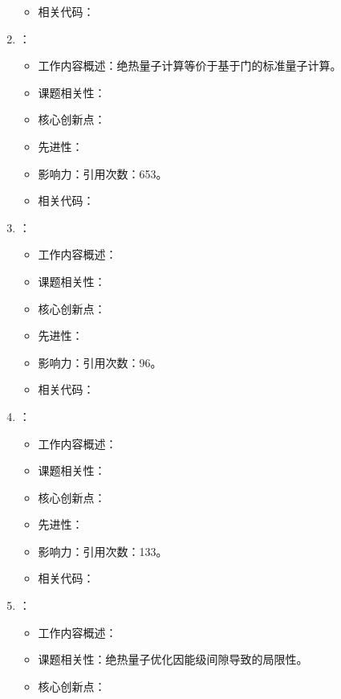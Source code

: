 \begin{enumerate}
\begin{itemize}
                \item 相关代码：
            \end{itemize}
            \item \citet{aharonov2008adiabatic}：
            \begin{itemize}
                \item 工作内容概述：绝热量子计算等价于基于门的标准量子计算。
                \item 课题相关性：
                \item 核心创新点：
                \item 先进性：
                \item 影响力：引用次数：653。
                \item 相关代码：
            \end{itemize}
            \item \citet{amin2009first}：
            \begin{itemize}
                \item 工作内容概述：
                \item 课题相关性：
                \item 核心创新点：
                \item 先进性：
                \item 影响力：引用次数：96。
                \item 相关代码：
            \end{itemize}
            \item \citet{bravyi2010complexity}：
            \begin{itemize}
                \item 工作内容概述：
                \item 课题相关性：
                \item 核心创新点：
                \item 先进性：
                \item 影响力：引用次数：133。
                \item 相关代码：
            \end{itemize}
            \item \citet{altshuler2010anderson}：
            \begin{itemize}
                \item 工作内容概述：
                \item 课题相关性：绝热量子优化因能级间隙导致的局限性。
                \item 核心创新点：

\end{itemize}
\end{enumerate}
